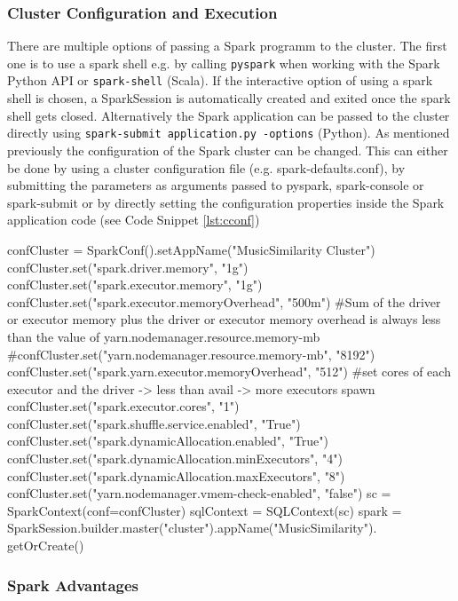 \subsubsection{Cluster Configuration and Execution}\label{cconfexp}


There are multiple options of passing a Spark programm to the cluster. The first one is to use a spark shell e.g. by calling \lstinline{pyspark} when working with the Spark Python API or \lstinline{spark-shell} (Scala). If the interactive option of using a spark shell is chosen, a SparkSession is automatically created and exited once the spark shell gets closed. 
Alternatively the Spark application can be passed to the cluster directly using \lstinline{spark-submit application.py -options} (Python).
As mentioned previously the configuration of the Spark cluster can be changed. This can either be done by using a cluster configuration file (e.g. spark-defaults.conf), by submitting the parameters as arguments passed to pyspark, spark-console or spark-submit or by directly setting the configuration properties inside the Spark application code (see Code Snippet \ref{lst:cconf})\\


\begin{pythonCode}[frame=single,label={lst:cconf},caption={Example cluster configuration Python},captionpos=b]
confCluster = SparkConf().setAppName("MusicSimilarity Cluster")
confCluster.set("spark.driver.memory", "1g")
confCluster.set("spark.executor.memory", "1g")
confCluster.set("spark.executor.memoryOverhead", "500m")
#Sum of the driver or executor memory plus the driver or executor memory overhead is always less than the value of yarn.nodemanager.resource.memory-mb
#confCluster.set("yarn.nodemanager.resource.memory-mb", "8192")
confCluster.set("spark.yarn.executor.memoryOverhead", "512")
#set cores of each executor and the driver -> less than avail -> more executors spawn
confCluster.set("spark.executor.cores", "1")
confCluster.set("spark.shuffle.service.enabled", "True")
confCluster.set("spark.dynamicAllocation.enabled", "True")
confCluster.set("spark.dynamicAllocation.minExecutors", "4")
confCluster.set("spark.dynamicAllocation.maxExecutors", "8")
confCluster.set("yarn.nodemanager.vmem-check-enabled", "false")
sc = SparkContext(conf=confCluster)
sqlContext = SQLContext(sc)
spark = SparkSession.builder.master("cluster").appName("MusicSimilarity").
	getOrCreate()
\end{pythonCode}

\subsubsection{Spark Advantages}

